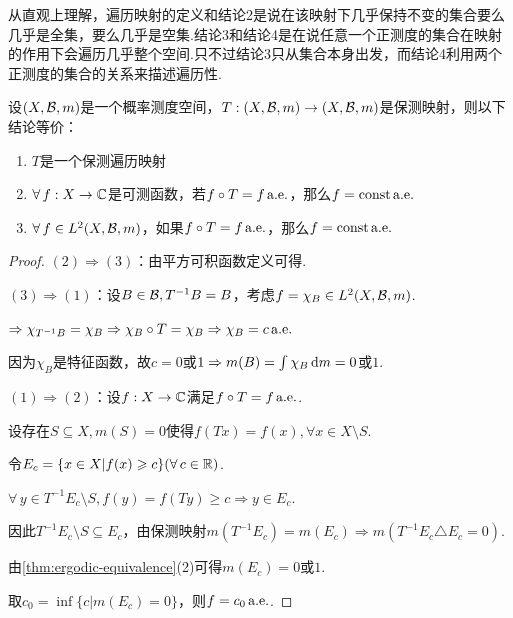 从直观上理解，遍历映射的定义和结论2是说在该映射下几乎保持不变的集合要么几乎是全集，要么几乎是空集.结论3和结论4是在说任意一个正测度的集合在映射的作用下会遍历几乎整个空间.只不过结论3只从集合本身出发，而结论4利用两个正测度的集合的关系来描述遍历性.


\begin{theorem}[遍历映射的等价函数刻画]
    \wideline
    设$(X,\mathcal{B},m)$是一个概率测度空间，$T:(X,\mathcal{B},m)\to(X,\mathcal{B},m)$是保测映射，则以下结论等价：
    \begin{enumerate}[(1)]
        \item $T$是一个保测遍历映射
        \item $\forall\, f:X\to\mathbb{C}$是可测函数，若$f\circ T=f\operatorname{\text{a.e.}}$，那么$f=\mathrm{const}\operatorname{\text{a.e.}}$
        \item $\forall\, f\in L^2(X,\mathcal{B},m)$，如果$f\circ T=f\operatorname{\text{a.e.}}$，那么$f=\mathrm{const}\operatorname{\text{a.e.}}$
    \end{enumerate}
\end{theorem}
\begin{proof}
    $(2)\Rightarrow(3)$：由平方可积函数定义可得.\par
    $(3)\Rightarrow(1)$：设$B\in\mathcal{B},T^{-1}B=B$，考虑$f=\chi_B\in L^2(X,\mathcal{B},m)$.\par
    $\Rightarrow \chi_{T^{-1}B}=\chi_B \Rightarrow \chi_{B}\circ T=\chi_B \Rightarrow \chi_B=c \operatorname{\text{a.e.}}$\par
    因为$\chi_B$是特征函数，故$c=0$或$1\Rightarrow m(B)=\int\chi_B\mathop{}\!\mathrm{d} m=0$或$1$.\par
    $(1)\Rightarrow (2)$：设$f:X\to\mathbb{C}$满足$f\circ T=f\operatorname{\text{a.e.}}$.\par
    设存在$S\subseteq X,m(S)=0$使得$f(Tx)=f(x),\forall x\in X\setminus S$.\par
    令$E_c=\{x\in X|f(x)\geqslant c\}(\forall\, c\in\mathbb{R})$.\par
    $\forall\, y\in T^{-1}E_c\setminus S,f(y)=f(Ty)\geq c\Rightarrow y\in E_c$.\par
    因此$T^{-1}E_c\setminus S\subseteq E_c$，由保测映射$m(T^{-1}E_c)=m(E_c)\Rightarrow m(T^{-1}E_c\triangle E_c=0)$.\par
    由\cref{thm:ergodic-equivalence}(2)可得$m(E_c)=0$或$1$.\par
    取$c_0=\inf\{c|m(E_c)=0\}$，则$f=c_0 \operatorname{\text{a.e.}}$.
\end{proof}

